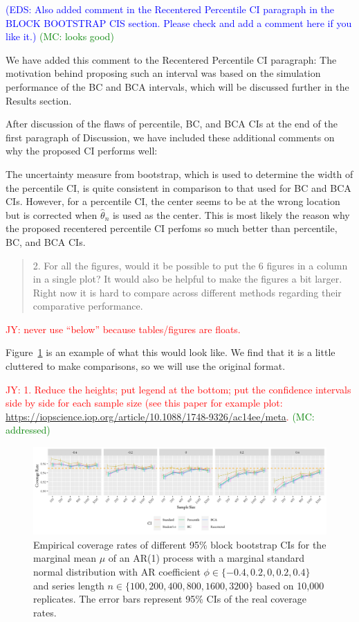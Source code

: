 \documentclass[12pt]{article}
\newcommand{\jy}[1]{\textcolor{red}{JY: #1}}
\newcommand{\eds}[1]{\textcolor{blue}{(EDS: #1)}}
\newcommand{\mc}[1]{\textcolor{green}{(MC: #1)}}
\newenvironment{comment}%
{\begin{quotation}\noindent\small\it\color{darkblue}\ignorespaces%
}{\end{quotation}}
\begin{document}
\eds{Also added comment in the Recentered Percentile CI paragraph in the 
BLOCK BOOTSTRAP CIS section. Please check and add a comment here if you like it.}
\mc{looks good}

We have added this comment to the Recentered Percentile CI paragraph:
The motivation behind proposing such an interval was based on the 
simulation performance of the BC and BCA intervals, which will be discussed
further in the Results section. 

After discussion of the flaws of percentile, BC, and BCA CIs at the end of the
first paragraph of Discussion, we have included these additional comments on
why the proposed CI performs well:

The uncertainty measure from bootstrap, which is used to determine the width of
the percentile CI, is quite consistent in comparison to that used for BC and 
BCA CIs. However, for a percentile CI, the center seems
to be at the wrong location but is corrected when $\hat\theta_n$ is used as the
center. This is most likely the reason why the proposed recentered percentile CI
perfoms so much better than percentile, BC, and BCA CIs.

\begin{comment}
2. For all the figures, would it be possible to put the 6 figures in a column in 
a single plot? It would also be helpful to make the figures a bit larger. Right 
now it is hard to compare across different methods regarding their comparative 
performance.
\end{comment}

\jy{never use ``below'' because tables/figures are floats.}

Figure~\ref{fig:mu} is an example of what this would look like. We find that it 
is a little
cluttered to make comparisons, so we will use the original format.

\jy{1. Reduce the heights; put legend at the bottom; put the
  confidence intervals side by side for each sample size (see this
  paper for example plot:
  \url{https://iopscience.iop.org/article/10.1088/1748-9326/ac14ee/meta}.}
\mc{addressed}

\begin{figure}[tbp]
  \centering
  \includegraphics[width=\textwidth]{figures/alt_plot_norm_mu_1}
  \caption{Empirical coverage rates of different 95\% block bootstrap CIs for
    the marginal mean $\mu$ of an AR(1) process with a marginal standard 
    normal distribution with AR coefficient
    $\phi \in \{-0.4, 0.2, 0, 0.2, 0.4\}$ and series length
    $n \in \{100, 200, 400, 800, 1600, 3200\}$ based on 10,000 replicates. The
    error bars represent 95\% CIs of the real coverage rates.}
  \label{fig:mu}
\end{figure}
\end{document}
